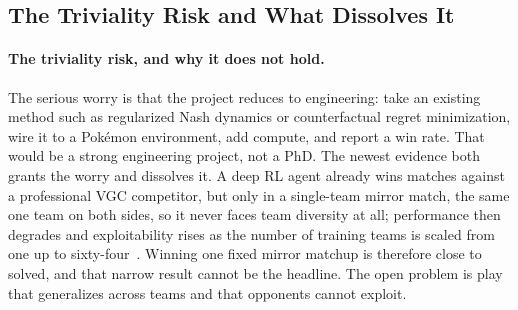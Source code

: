 \subsection{The Triviality Risk and What Dissolves It}
\label{subsec:triviality}
\paragraph{The triviality risk, and why it does not hold.}
The serious worry is that the project reduces to engineering: take an existing
method such as regularized Nash dynamics or counterfactual regret minimization,
wire it to a Pok\'{e}mon environment, add compute, and report a win rate. That
would be a strong engineering project, not a PhD. The newest evidence both grants
the worry and dissolves it. A deep RL agent already wins matches against a
professional VGC competitor, but only in a single-team mirror match, the same one
team on both sides, so it never faces team diversity at all; performance then
degrades and exploitability rises as the number of training teams is scaled from
one up to sixty-four~\cite{angliss2026vgcbench}. Winning one fixed mirror matchup
is therefore close to solved, and that narrow result cannot be the headline. The
open problem is play that generalizes across teams and that opponents cannot
exploit.
